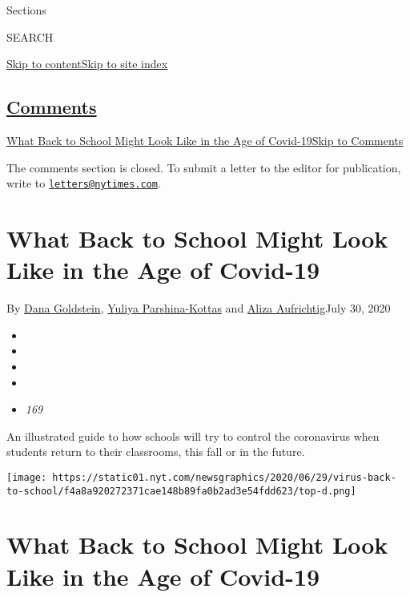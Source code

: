 Sections

SEARCH

\protect\hyperlink{site-content}{Skip to
content}\protect\hyperlink{site-index}{Skip to site index}

\hypertarget{comments}{%
\subsection{\texorpdfstring{\protect\hyperlink{commentsContainer}{Comments}}{Comments}}\label{comments}}

\href{}{What Back to School Might Look Like in the Age of
Covid-19}\href{}{Skip to Comments}

The comments section is closed. To submit a letter to the editor for
publication, write to
\href{mailto:letters@nytimes.com}{\nolinkurl{letters@nytimes.com}}.

\hypertarget{what-back-to-school-might-look-like-in-the-age-of-covid-19}{%
\section{What Back to School Might Look Like in the Age of
Covid-19}\label{what-back-to-school-might-look-like-in-the-age-of-covid-19}}

By \href{https://www.nytimes.com/by/dana-goldstein}{Dana Goldstein},
\href{https://www.nytimes.com/by/yuliya-parshina-kottas}{Yuliya
Parshina-Kottas} and
\href{https://www.nytimes.com/by/aliza-aufrichtig}{Aliza Aufrichtig}July
30, 2020

\begin{itemize}
\item
\item
\item
\item
\item
  \emph{169}
\end{itemize}

An illustrated guide to how schools will try to control the coronavirus
when students return to their classrooms, this fall or in the future.

\texttt{[image: https://static01.nyt.com/newsgraphics/2020/06/29/virus-back-to-school/f4a8a920272371cae148b89fa0b2ad3e54fdd623/top-d.png]}

\hypertarget{what-back-to-school-might-look-like-in-the-age-of-covid-19-1}{%
\section{What Back to School Might Look Like in the Age of
Covid-19}\label{what-back-to-school-might-look-like-in-the-age-of-covid-19-1}}

